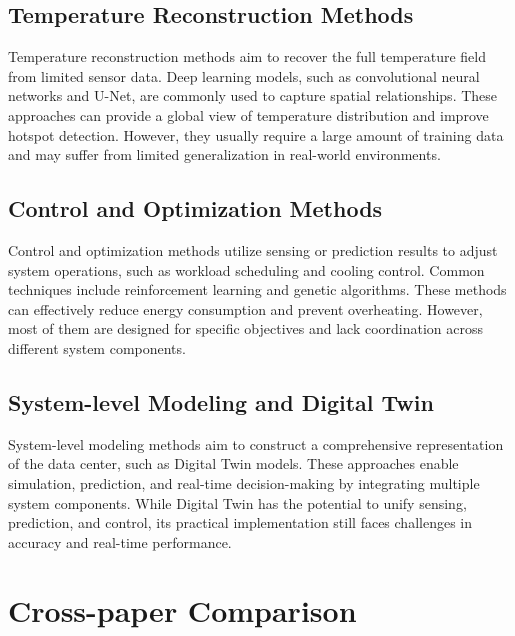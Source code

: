 \documentclass[12pt,a4paper]{article}
\begin{document}
    \subsection{Temperature Reconstruction Methods}
    Temperature reconstruction methods aim to recover the full temperature field from limited sensor data. Deep learning models, such as convolutional neural networks and U-Net, are commonly used to capture spatial relationships. These approaches can provide a global view of temperature distribution and improve hotspot detection. However, they usually require a large amount of training data and may suffer from limited generalization in real-world environments.

    \subsection{Control and Optimization Methods}
    Control and optimization methods utilize sensing or prediction results to adjust system operations, such as workload scheduling and cooling control. Common techniques include reinforcement learning and genetic algorithms. These methods can effectively reduce energy consumption and prevent overheating. However, most of them are designed for specific objectives and lack coordination across different system components.

    \subsection{System-level Modeling and Digital Twin}
    System-level modeling methods aim to construct a comprehensive representation of the data center, such as Digital Twin models. These approaches enable simulation, prediction, and real-time decision-making by integrating multiple system components. While Digital Twin has the potential to unify sensing, prediction, and control, its practical implementation still faces challenges in accuracy and real-time performance.

\section{Cross-paper Comparison}
\end{document}
